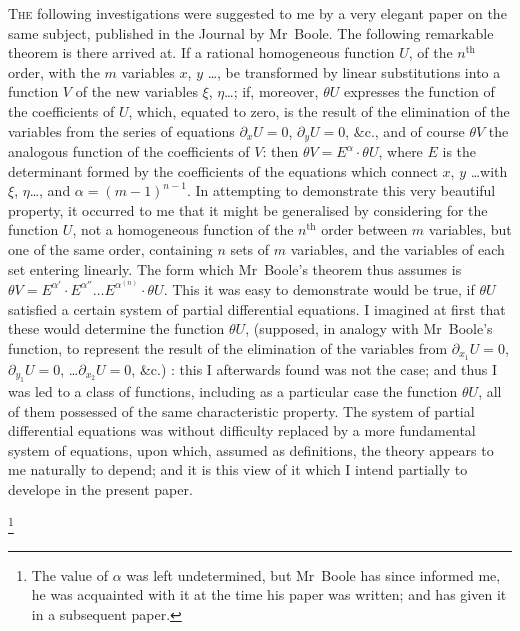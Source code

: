 \documentclass[11pt,a4paper]{book}
\begin{document}
\textsc{The} following investigations were suggested to me by a very elegant paper on
the same subject, published in the Journal by Mr~Boole. The following remarkable
theorem is there arrived at. If a rational homogeneous function $U$, of the $n^{\text{th}}$ order,
with the $m$ variables $x$, $y$ \ldots, be transformed by linear substitutions into a function
$V$ of the new variables $\xi$, $\eta$\ldots; if, moreover, $\theta U$ expresses the function of the
coefficients of $U$, which, equated to zero, is the result of the elimination of the
variables from the series of equations $\partial_x U=0$, $\partial_y U=0$, \&c., and of course $\theta V$ the
analogous function of the coefficients of $V$: then $\theta V = E^{\alpha} \cdot \theta U$, where $E$ is the
determinant formed by the coefficients of the equations which connect $x$, $y$ \ldots with
$\xi$, $\eta$\ldots, and $\alpha = (m-1)^{n-1}$. In attempting to demonstrate this very beautiful property,
it occurred to me that it might be generalised by considering for the function $U$, not
a homogeneous function of the $n^{\text{th}}$ order between $m$ variables, but one of the same
order, containing $n$ sets of $m$ variables, and the variables of each set entering
linearly. The form which Mr~Boole's theorem thus assumes is $\theta V = E^{\alpha'} \cdot E^{\alpha''} \ldots E^{\alpha^{(n)}} \cdot \theta U$.
This it was easy to demonstrate would be true, if $\theta U$ satisfied a certain system of
partial differential equations. I imagined at first that these would determine the
function $\theta U$, (supposed, in analogy with Mr~Boole's function, to represent the result of
the elimination of the variables from $\partial_{x_1}U=0$, $\partial_{y_1}U=0$, \ldots $\partial_{x_2}U=0$, \&c.) : this I afterwards
found was not the case; and thus I was led to a class of functions, including as
a particular case the function $\theta U$, all of them possessed of the same characteristic
property. The system of partial differential equations was without difficulty replaced
by a more fundamental system of equations, upon which, assumed as definitions, the
theory appears to me naturally to depend; and it is this view of it which I intend
partially to develope in the present paper.

\footnote{The value of $\alpha$ was left undetermined, but Mr~Boole has since informed me, he was acquainted with
it at the time his paper was written; and has given it in a subsequent paper.}
\end{document}
